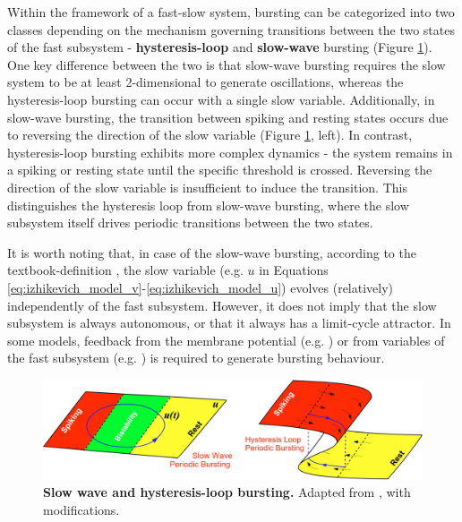 \documentclass[../main.tex]{subfiles}
\begin{document}
Within the framework of a fast-slow system, bursting can be categorized into two classes depending on the mechanism governing transitions between the two states of the fast subsystem - \textbf{hysteresis-loop} and \textbf{slow-wave} bursting (Figure \ref{fig:slow_wave_and_hysteresis_bursting}). One key difference between the two is that slow-wave bursting requires the slow system to be at least 2-dimensional to generate oscillations,
whereas the hysteresis-loop bursting can occur with a single slow variable. Additionally, in slow-wave bursting, the transition between spiking and resting states occurs due to reversing the direction of the slow variable (Figure \ref{fig:slow_wave_and_hysteresis_bursting}, left). In contrast, hysteresis-loop bursting exhibits more complex dynamics - the system remains in a spiking or resting state until the specific threshold is crossed. Reversing the direction of the slow variable is insufficient to induce the transition. This distinguishes the hysteresis loop from slow-wave bursting, where the slow subsystem itself drives periodic transitions between the two states.

It is worth noting that, in case of the slow-wave bursting, according to the textbook-definition \parencite{izhikevichNEURALEXCITABILITYSPIKING2000,izhikevichDynamicalSystemsNeuroscience2006}, the slow variable (e.g. $u$ in Equations \ref{eq:izhikevich_model_v}-\ref{eq:izhikevich_model_u}) evolves (relatively) independently of the fast subsystem. However, it does not imply that the slow subsystem is always autonomous, or that it always has a limit-cycle attractor. In some models, feedback from the membrane potential (e.g. \cite[p. 356]{izhikevichDynamicalSystemsNeuroscience2006}) or from variables of the fast subsystem (e.g. \cite[p. 1201]{izhikevichNEURALEXCITABILITYSPIKING2000}) is required to generate bursting behaviour.

\begin{figure}[!t]
    \centering
    \includegraphics[width=0.95\linewidth]{../img/2_mathematical_overview/slow_wave_and_hysteresis_bursting.png}
    \caption[Slow wave and hysteresis-loop bursting]{
        \textbf{Slow wave and hysteresis-loop bursting.}
        Adapted from \parencite{izhikevichDynamicalSystemsNeuroscience2006}, with modifications.
    }
    \label{fig:slow_wave_and_hysteresis_bursting}
\end{figure}
\end{document}

